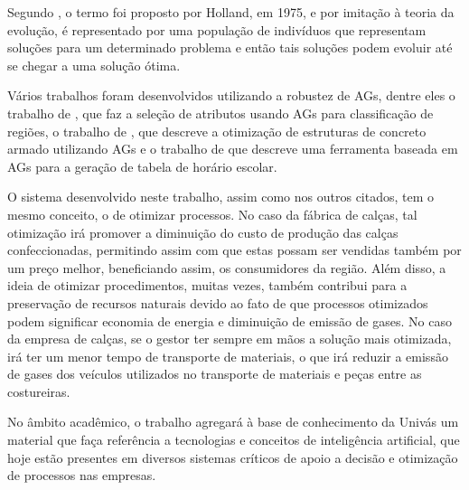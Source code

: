 \par Segundo , o termo foi proposto
por Holland, em 1975, e por imitação à teoria da evolução, é representado por
uma população de indivíduos que representam soluções para um determinado problema e então tais soluções
podem evoluir até se chegar a uma solução ótima.

\par Vários trabalhos foram desenvolvidos utilizando a robustez de AGs, dentre
eles o trabalho de , que faz a seleção de
atributos usando AGs para classificação de
regiões, o trabalho de , que descreve a
otimização de estruturas de concreto armado utilizando AGs e 
o trabalho de  que descreve uma ferramenta
baseada em AGs para a geração de tabela de horário escolar.

\par O sistema desenvolvido neste trabalho, assim como nos outros citados, 
tem o mesmo conceito, o de otimizar processos. No caso da fábrica de calças, 
tal otimização irá promover a diminuição do custo de produção das calças confeccionadas, 
permitindo assim com que estas possam ser vendidas também por um preço melhor, 
beneficiando assim, os consumidores da região. 
Além disso, a ideia de otimizar procedimentos, muitas vezes, também contribui
para a preservação de recursos naturais devido ao fato de que processos otimizados 
podem significar economia de energia e diminuição de emissão de gases. 
No caso da empresa de calças, se o gestor ter sempre em mãos a solução mais otimizada, 
irá ter um menor tempo de transporte de materiais, o que irá reduzir a emissão de gases 
dos veículos utilizados no transporte de materiais e peças entre as costureiras.

\par No âmbito acadêmico, o trabalho agregará à base de conhecimento
da Univás um material que faça referência a tecnologias e conceitos de inteligência
artificial, que hoje estão presentes em diversos sistemas críticos de apoio a
decisão e otimização de processos nas empresas.




%